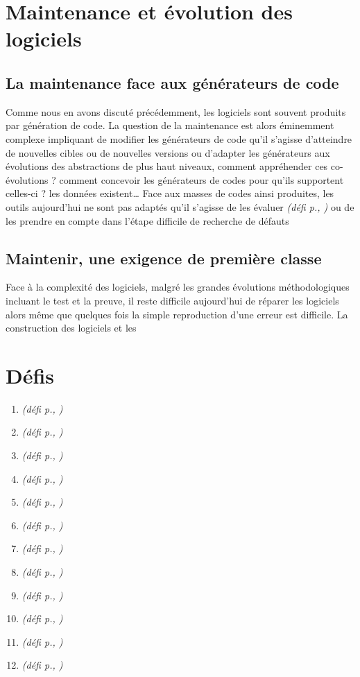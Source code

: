 \documentclass[11pt]{article}
\newcommand{\defi}[1]{\emph{(défi p.\pageref{#1}, \cite{#1})}}
\begin{document}
\section{Maintenance et évolution des logiciels}

\subsection{La maintenance face aux générateurs de code}
Comme nous en avons discuté précédemment, les logiciels sont souvent produits par génération de code. La question de la maintenance est alors éminemment complexe impliquant de modifier les générateurs de code qu'il s'agisse d'atteindre de nouvelles cibles ou de nouvelles versions ou d'adapter les générateurs aux évolutions des abstractions de plus haut niveaux, comment appréhender ces co-évolutions ? comment concevoir les générateurs de codes pour qu'ils supportent celles-ci ? les données existent… 
Face aux masses de codes ainsi produites, les outils aujourd'hui ne sont pas adaptés qu'il s'agisse de les évaluer \defi{coevolution} ou de les prendre en compte dans l'étape difficile de recherche de défauts \cite{debugger}

\subsection{Maintenir, une exigence de première classe}
Face à la complexité des logiciels, malgré les grandes évolutions méthodologiques incluant le test et la preuve, il reste difficile aujourd'hui de réparer les logiciels alors même que quelques fois la simple reproduction d'une erreur est difficile. La construction des logiciels et les 




\section*{Défis}
\begin{enumerate}
\item \defi{combinatoire}
\item \defi{vert}
\item \defi{GLE}
\item \defi{debuggers}
\item \defi{securite}
\item \defi{coevolution}
\item \defi{compilation}
\item \defi{reconfiguration}
\item \defi{argumentation}
\item \defi{IA}
\item \defi{Monniaux}
\item \defi{formelle}
\end{enumerate}
\end{document}
